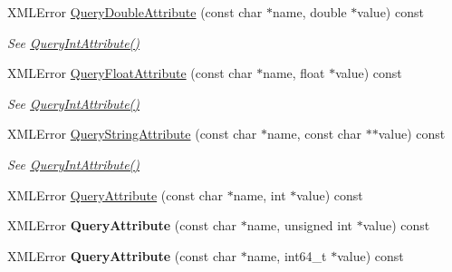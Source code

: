 \begin{DoxyCompactItemize}
X\+M\+L\+Error \hyperlink{classtinyxml2_1_1_x_m_l_element_a5f0964e2dbd8e2ee7fce9beab689443c}{Query\+Double\+Attribute} (const char $\ast$name, double $\ast$value) const
\begin{DoxyCompactList}\small\item\em See \hyperlink{classtinyxml2_1_1_x_m_l_element_a8a78bc1187c1c45ad89f2690eab567b1}{Query\+Int\+Attribute()} \end{DoxyCompactList}\item 
\mbox{\label{classtinyxml2_1_1_x_m_l_element_acd5eeddf6002ef90806af794b9d9a5a5}} 
X\+M\+L\+Error \hyperlink{classtinyxml2_1_1_x_m_l_element_acd5eeddf6002ef90806af794b9d9a5a5}{Query\+Float\+Attribute} (const char $\ast$name, float $\ast$value) const
\begin{DoxyCompactList}\small\item\em See \hyperlink{classtinyxml2_1_1_x_m_l_element_a8a78bc1187c1c45ad89f2690eab567b1}{Query\+Int\+Attribute()} \end{DoxyCompactList}\item 
\mbox{\label{classtinyxml2_1_1_x_m_l_element_adb8ae765f98d0c5037faec48deea78bc}} 
X\+M\+L\+Error \hyperlink{classtinyxml2_1_1_x_m_l_element_adb8ae765f98d0c5037faec48deea78bc}{Query\+String\+Attribute} (const char $\ast$name, const char $\ast$$\ast$value) const
\begin{DoxyCompactList}\small\item\em See \hyperlink{classtinyxml2_1_1_x_m_l_element_a8a78bc1187c1c45ad89f2690eab567b1}{Query\+Int\+Attribute()} \end{DoxyCompactList}\item 
X\+M\+L\+Error \hyperlink{classtinyxml2_1_1_x_m_l_element_a5b7df3bed2b8954eabf227fa204522eb}{Query\+Attribute} (const char $\ast$name, int $\ast$value) const
\item 
\mbox{\label{classtinyxml2_1_1_x_m_l_element_a432276ea6e034cad19ad66de887ee13c}} 
X\+M\+L\+Error {\bfseries Query\+Attribute} (const char $\ast$name, unsigned int $\ast$value) const
\item 
\mbox{\label{classtinyxml2_1_1_x_m_l_element_a4867aea7a812acf7f00a915e4eaeaf3e}} 
X\+M\+L\+Error {\bfseries Query\+Attribute} (const char $\ast$name, int64\+\_\+t $\ast$value) const
$$
\end{DoxyCompactItemize}
